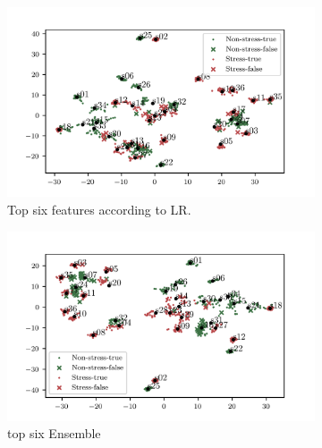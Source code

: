 \documentclass[pdflatex,sn-mathphys]{sn-jnl}%
\theoremstyle{thmstyleone}%
\theoremstyle{thmstyletwo}%
\theoremstyle{thmstylethree}%
\begin{document}
\begin{figure}[h!]
    \caption{The top six and top eight features from $\text{Rank}_{\text{LR}}$ and $\text{Rank}_{\text{Ensemble}}$ plot in t-SNE space.}
    \label{fig:t-SNE_lr-ensemble}
    
    \centering
    \begin{subfigure}[b]{0.49\textwidth}
        \centering
        \includegraphics[width=\textwidth]{figures/t-sne-lr-6.png}
        \caption{Top six features according to LR.}
    \end{subfigure}
    \hfill
    \begin{subfigure}[b]{0.49\textwidth}
        \centering
        \includegraphics[width=\textwidth]{figures/t-sne-ensemble-6.png}
        \caption{top six Ensemble}
    \end{subfigure}
    \\
    \begin{subfigure}[b]{0.49\textwidth}
        \centering

\end{subfigure}
\end{figure}
\end{document}
